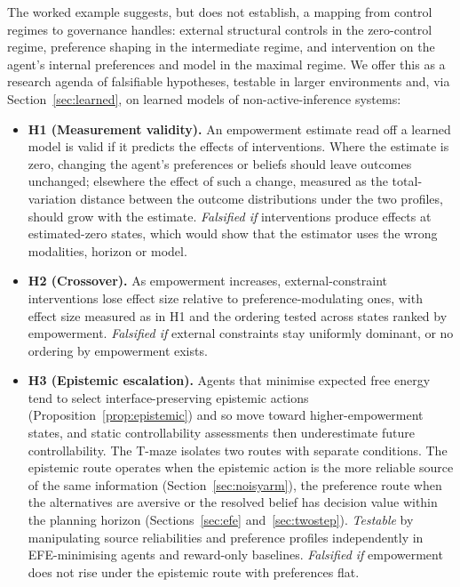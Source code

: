 \documentclass[letterpaper]{article} %
\theoremstyle{definition}
\begin{document}
The worked example suggests, but does not establish, a mapping from control regimes to governance handles: external structural controls in the zero-control regime, preference shaping in the intermediate regime, and intervention on the agent's internal preferences and model in the maximal regime. We offer this as a research agenda of falsifiable hypotheses, testable in larger environments and, via Section~\ref{sec:learned}, on learned models of non-active-inference systems:
\begin{itemize}
    \item \textbf{H1 (Measurement validity).} An empowerment estimate read off a learned model is valid if it predicts the effects of interventions. Where the estimate is zero, changing the agent's preferences or beliefs should leave outcomes unchanged; elsewhere the effect of such a change, measured as the total-variation distance between the outcome distributions under the two profiles, should grow with the estimate. \emph{Falsified if} interventions produce effects at estimated-zero states, which would show that the estimator uses the wrong modalities, horizon or model.
    \item \textbf{H2 (Crossover).} As empowerment increases, external-constraint interventions lose effect size relative to preference-modulating ones, with effect size measured as in H1 and the ordering tested across states ranked by empowerment. \emph{Falsified if} external constraints stay uniformly dominant, or no ordering by empowerment exists.
    \item \textbf{H3 (Epistemic escalation).} Agents that minimise expected free energy tend to select interface-preserving epistemic actions (Proposition~\ref{prop:epistemic}) and so move toward higher-empowerment states, and static controllability assessments then underestimate future controllability. The T-maze isolates two routes with separate conditions. The epistemic route operates when the epistemic action is the more reliable source of the same information (Section~\ref{sec:noisyarm}), the preference route when the alternatives are aversive or the resolved belief has decision value within the planning horizon (Sections~\ref{sec:efe} and~\ref{sec:twostep}). \emph{Testable} by manipulating source reliabilities and preference profiles independently in EFE-minimising agents and reward-only baselines. \emph{Falsified if} empowerment does not rise under the epistemic route with preferences flat.
\end{itemize}
\end{document}
